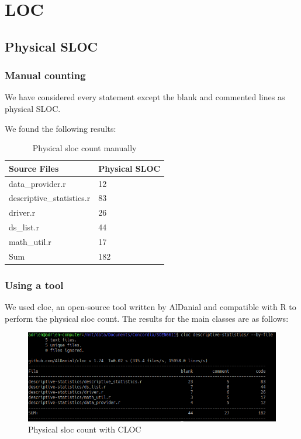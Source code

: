 \documentclass[11pt]{article}
\begin{document}
\section{LOC}

\subsection{Physical SLOC}

\subsubsection{Manual counting}

We have considered every statement except the blank and commented lines as physical SLOC.

We found the following results:

\begin{table}[ht!]
\centering
\begin{tabular}{|l|l|}
\hline
Source Files              & Physical SLOC \\ \hline
data\_provider.r          & 12            \\ \hline
descriptive\_statistics.r & 83            \\ \hline
driver.r                  & 26            \\ \hline
ds\_list.r                & 44            \\ \hline
math\_util.r              & 17            \\ \hline
Sum                       & 182           \\ \hline
\end{tabular}
\caption{Physical \gls{sloc} count manually}
\end{table}

\subsubsection{Using a tool}

We used \gls{cloc}, an open-source tool written by AlDanial \cite{cloc} and compatible with R to perform the physical \gls{sloc} count. The results for the main classes are as follows:

\begin{figure}[h!]
	\centering
		\includegraphics[width=\textwidth]{cloc.png}
	\caption{Physical \gls{sloc} count with CLOC}
	\label{fig:cloc}
\end{figure}
\end{document}
